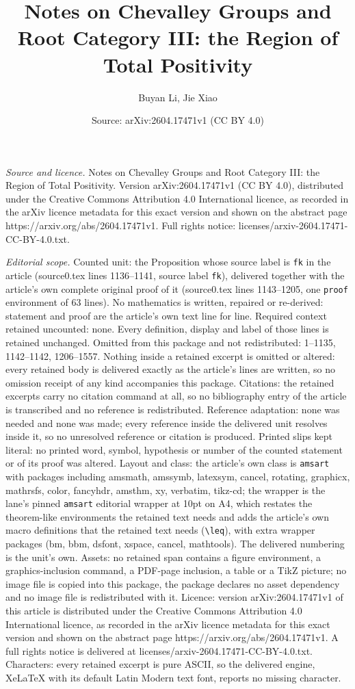\documentclass[10pt,a4paper]{amsart}
\title[Notes on Chevalley Groups and Root Category III: the Region ]{Notes on Chevalley Groups and Root Category III: the Region of Total Positivity}
\author{Buyan Li, Jie Xiao}
\date{Source: arXiv:2604.17471v1 (CC BY 4.0)}
\begin{document}
\maketitle

\noindent\emph{Source and licence.} Notes on Chevalley Groups and Root Category III: the Region of Total Positivity. Version arXiv:2604.17471v1 (CC BY 4.0), distributed under the Creative Commons Attribution 4.0 International licence, as recorded in the arXiv licence metadata for this exact version and shown on the abstract page https://arxiv.org/abs/2604.17471v1. Full rights notice: licenses/arxiv-2604.17471-CC-BY-4.0.txt.\par\smallskip

\noindent\textit{Editorial scope.} Counted unit: the Proposition whose source label is \texttt{fk} in the article (source0.tex lines 1136--1141, source label \texttt{fk}), delivered together with the article's own complete original proof of it (source0.tex lines 1143--1205, one \texttt{proof} environment of 63 lines). No mathematics is written, repaired or re-derived: statement and proof are the article's own text line for line. Required context retained uncounted: none. Every definition, display and label of those lines is retained unchanged. Omitted from this package and not redistributed: 1--1135, 1142--1142, 1206--1557. Nothing inside a retained excerpt is omitted or altered: every retained body is delivered exactly as the article's lines are written, so no omission receipt of any kind accompanies this package. Citations: the retained excerpts carry no citation command at all, so no bibliography entry of the article is transcribed and no reference is redistributed. Reference adaptation: none was needed and none was made; every reference inside the delivered unit resolves inside it, so no unresolved reference or citation is produced. Printed slips kept literal: no printed word, symbol, hypothesis or number of the counted statement or of its proof was altered. Layout and class: the article's own class is \texttt{amsart} with packages including amsmath, amssymb, latexsym, cancel, rotating, graphicx, mathrsfs, color, fancyhdr, amsthm, xy, verbatim, tikz-cd; the wrapper is the lane's pinned \texttt{amsart} editorial wrapper at 10pt on A4, which restates the theorem-like environments the retained text needs and adds the article's own macro definitions that the retained text needs (\texttt{\textbackslash leq}), with extra wrapper packages (bm, bbm, dsfont, xspace, cancel, mathtools). The delivered numbering is the unit's own. Assets: no retained span contains a figure environment, a graphics-inclusion command, a PDF-page inclusion, a table or a TikZ picture; no image file is copied into this package, the package declares no asset dependency and no image file is redistributed with it. Licence: version arXiv:2604.17471v1 of this article is distributed under the Creative Commons Attribution 4.0 International licence, as recorded in the arXiv licence metadata for this exact version and shown on the abstract page https://arxiv.org/abs/2604.17471v1. A full rights notice is delivered at licenses/arxiv-2604.17471-CC-BY-4.0.txt. Characters: every retained excerpt is pure ASCII, so the delivered engine, XeLaTeX with its default Latin Modern text font, reports no missing character.
\end{document}

